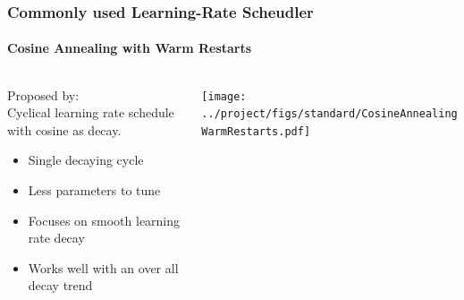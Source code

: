 \documentclass[10pt,aspectratio=169]{beamer}
\begin{document}
    \begin{frame}
        \frametitle{Commonly used Learning-Rate Scheudler}
        \framesubtitle{Cosine Annealing with Warm Restarts}
        \begin{columns}
            \begin{column}{0.5\textwidth}
                Proposed by: \cite{loshchilov2016sgdr} \\
                Cyclical learning rate schedule with cosine as decay.
                \vspace{0.5cm}
                \begin{itemize}
                    \item Single decaying cycle
                    \item Less parameters to tune
                    \item Focuses on smooth learning rate decay
                    \item Works well with an over all decay trend \cite{gotmare2018closer}
                \end{itemize}
            \end{column}
            \begin{column}{0.5\textwidth}
                \texttt{[image: ../project/figs/standard/CosineAnnealingWarmRestarts.pdf]}
            \end{column}
        \end{columns}
    \end{frame}
\end{document}
